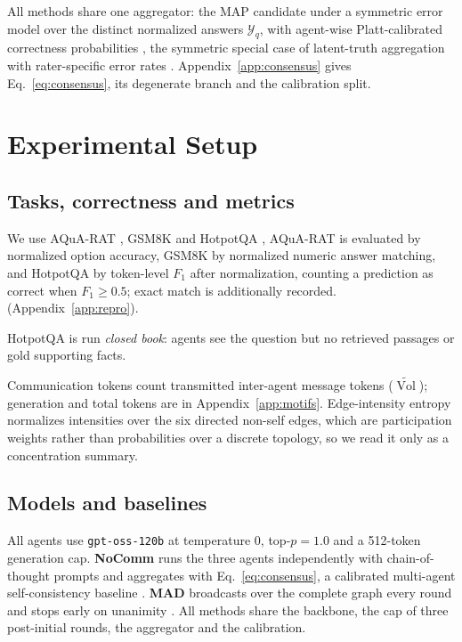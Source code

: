 \documentclass[11pt]{article}
\newcommand{\Vol}{\operatorname{Vol}}
\newcommand{\Volt}{\widetilde{\Vol}}
\begin{document}
All methods share one aggregator: the MAP candidate under a symmetric error
model over the distinct normalized answers $\mathcal{Y}_q$, with agent-wise
Platt-calibrated correctness probabilities \citep{platt1999probabilistic}, the
symmetric special case of latent-truth aggregation with rater-specific error
rates \citep{dawid1979maximum}. Appendix~\ref{app:consensus} gives
Eq.~\ref{eq:consensus}, its degenerate branch and the calibration split.

\section{Experimental Setup}
\label{sec:experiments}

\subsection{Tasks, correctness and metrics}
\label{sec:tasks}

We use AQuA-RAT \citep{ling-etal-2017-program}, GSM8K
\citep{cobbe2021trainingverifierssolvemath} and HotpotQA
\citep{yang-etal-2018-hotpotqa}, AQuA-RAT is evaluated by normalized option
accuracy, GSM8K by normalized numeric answer matching, and HotpotQA by
token-level $F_1$ after normalization, counting a prediction as correct when
$F_1\ge0.5$; exact match is additionally recorded. (Appendix~\ref{app:repro}).

HotpotQA is run \emph{closed book}: agents see the question but no retrieved
passages or gold supporting facts.

Communication tokens count transmitted inter-agent message tokens ($\Volt$);
generation and total tokens are in Appendix~\ref{app:motifs}. Edge-intensity
entropy normalizes intensities over the six directed non-self edges, which are
participation weights rather than probabilities over a discrete topology, so we
read it only as a concentration summary.

\subsection{Models and baselines}

All agents use \texttt{gpt-oss-120b}
\citep{openai2025gptoss120bgptoss20bmodel} at temperature $0$, top-$p=1.0$ and a
512-token generation cap. \textbf{NoComm} runs the three agents independently
with chain-of-thought prompts and aggregates with Eq.~\ref{eq:consensus}, a
calibrated multi-agent self-consistency baseline
\citep{wei2022chain,wang2023selfconsistencyimproveschainthought}. \textbf{MAD}
broadcasts over the complete graph every round and stops early on unanimity
\citep{du2024improving,liang-etal-2024-encouraging}. All methods share the
backbone, the cap of three post-initial rounds, the aggregator and the
calibration.
\end{document}
